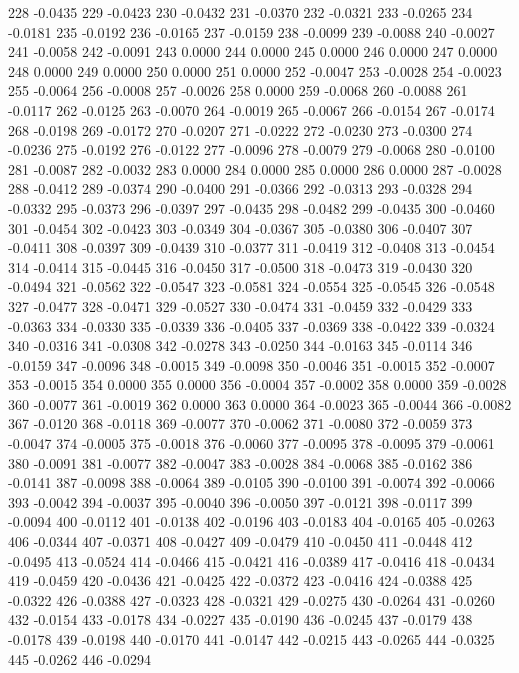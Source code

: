 228 -0.0435
229 -0.0423
230 -0.0432
231 -0.0370
232 -0.0321
233 -0.0265
234 -0.0181
235 -0.0192
236 -0.0165
237 -0.0159
238 -0.0099
239 -0.0088
240 -0.0027
241 -0.0058
242 -0.0091
243 0.0000
244 0.0000
245 0.0000
246 0.0000
247 0.0000
248 0.0000
249 0.0000
250 0.0000
251 0.0000
252 -0.0047
253 -0.0028
254 -0.0023
255 -0.0064
256 -0.0008
257 -0.0026
258 0.0000
259 -0.0068
260 -0.0088
261 -0.0117
262 -0.0125
263 -0.0070
264 -0.0019
265 -0.0067
266 -0.0154
267 -0.0174
268 -0.0198
269 -0.0172
270 -0.0207
271 -0.0222
272 -0.0230
273 -0.0300
274 -0.0236
275 -0.0192
276 -0.0122
277 -0.0096
278 -0.0079
279 -0.0068
280 -0.0100
281 -0.0087
282 -0.0032
283 0.0000
284 0.0000
285 0.0000
286 0.0000
287 -0.0028
288 -0.0412
289 -0.0374
290 -0.0400
291 -0.0366
292 -0.0313
293 -0.0328
294 -0.0332
295 -0.0373
296 -0.0397
297 -0.0435
298 -0.0482
299 -0.0435
300 -0.0460
301 -0.0454
302 -0.0423
303 -0.0349
304 -0.0367
305 -0.0380
306 -0.0407
307 -0.0411
308 -0.0397
309 -0.0439
310 -0.0377
311 -0.0419
312 -0.0408
313 -0.0454
314 -0.0414
315 -0.0445
316 -0.0450
317 -0.0500
318 -0.0473
319 -0.0430
320 -0.0494
321 -0.0562
322 -0.0547
323 -0.0581
324 -0.0554
325 -0.0545
326 -0.0548
327 -0.0477
328 -0.0471
329 -0.0527
330 -0.0474
331 -0.0459
332 -0.0429
333 -0.0363
334 -0.0330
335 -0.0339
336 -0.0405
337 -0.0369
338 -0.0422
339 -0.0324
340 -0.0316
341 -0.0308
342 -0.0278
343 -0.0250
344 -0.0163
345 -0.0114
346 -0.0159
347 -0.0096
348 -0.0015
349 -0.0098
350 -0.0046
351 -0.0015
352 -0.0007
353 -0.0015
354 0.0000
355 0.0000
356 -0.0004
357 -0.0002
358 0.0000
359 -0.0028
360 -0.0077
361 -0.0019
362 0.0000
363 0.0000
364 -0.0023
365 -0.0044
366 -0.0082
367 -0.0120
368 -0.0118
369 -0.0077
370 -0.0062
371 -0.0080
372 -0.0059
373 -0.0047
374 -0.0005
375 -0.0018
376 -0.0060
377 -0.0095
378 -0.0095
379 -0.0061
380 -0.0091
381 -0.0077
382 -0.0047
383 -0.0028
384 -0.0068
385 -0.0162
386 -0.0141
387 -0.0098
388 -0.0064
389 -0.0105
390 -0.0100
391 -0.0074
392 -0.0066
393 -0.0042
394 -0.0037
395 -0.0040
396 -0.0050
397 -0.0121
398 -0.0117
399 -0.0094
400 -0.0112
401 -0.0138
402 -0.0196
403 -0.0183
404 -0.0165
405 -0.0263
406 -0.0344
407 -0.0371
408 -0.0427
409 -0.0479
410 -0.0450
411 -0.0448
412 -0.0495
413 -0.0524
414 -0.0466
415 -0.0421
416 -0.0389
417 -0.0416
418 -0.0434
419 -0.0459
420 -0.0436
421 -0.0425
422 -0.0372
423 -0.0416
424 -0.0388
425 -0.0322
426 -0.0388
427 -0.0323
428 -0.0321
429 -0.0275
430 -0.0264
431 -0.0260
432 -0.0154
433 -0.0178
434 -0.0227
435 -0.0190
436 -0.0245
437 -0.0179
438 -0.0178
439 -0.0198
440 -0.0170
441 -0.0147
442 -0.0215
443 -0.0265
444 -0.0325
445 -0.0262
446 -0.0294
